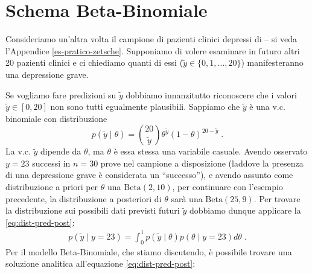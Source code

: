 \documentclass[
  10pt,
  italian,
  a4paper,
  extrafontsizes,onecolumn,openright
  ]{memoir}
\begin{document}
\hypertarget{schema-beta-bin-distr-pred-post}{%
\section{Schema Beta-Binomiale}\label{schema-beta-bin-distr-pred-post}}

Consideriamo un'altra volta il campione di pazienti clinici depressi di \textcite{zetschefuture2019} -- si veda l'Appendice \ref{es-pratico-zetsche}. Supponiamo di volere esaminare in futuro altri 20 pazienti clinici e ci chiediamo quanti di essi (\(\tilde{y} \in \{0, 1, \dots, 20\}\)) manifesteranno una depressione grave.

Se vogliamo fare predizioni su \(\tilde{y}\) dobbiamo innanzitutto riconoscere che i valori \(\tilde{y} \in [0, 20]\) non sono tutti egualmente plausibili. Sappiamo che \(\tilde{y}\) è una v.c. binomiale con distribuzione
\begin{equation}
p(\tilde{y}\mid \theta) = \binom{20}{\tilde{y}} \theta^{\tilde{y}}(1-\theta)^{20 - \tilde{y}} \; .
\label{eq:post-yprime}
\end{equation}
La v.c. \(\tilde{y}\) dipende da \(\theta\), ma \(\theta\) è essa stessa una variabile casuale. Avendo osservato \(y = 23\) successi in \(n = 30\) prove nel campione a disposizione (laddove la presenza di una depressione grave è considerata un ``successo''), e avendo assunto come distribuzione a priori per \(\theta\) una \(\mbox{Beta}(2, 10)\), per continuare con l'esempio precedente, la distribuzione a posteriori di \(\theta\) sarà una \(\mbox{Beta}(25, 9)\). Per trovare la distribuzione sui possibili dati previsti futuri \(\tilde{y}\) dobbiamo dunque applicare la \eqref{eq:dist-pred-post}:
\begin{align}
p(\tilde{y} \mid y = 23) = \int_0^1 p(\tilde{y} \mid \theta) p(\theta \mid y = 23) d\theta \; .
\label{eq:post-yprime-y17}
\end{align}
Per il modello Beta-Binomiale, che stiamo discutendo, è possibile trovare una soluzione analitica all'equazione \eqref{eq:dist-pred-post}:
\end{document}
